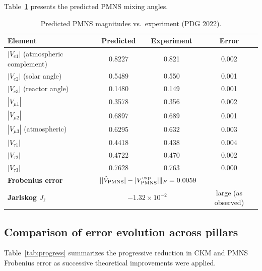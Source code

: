 \documentclass[11pt,a4paper]{article}
\theoremstyle{definition}
\theoremstyle{remark}
\begin{document}
Table~\ref{tab:pmns} presents the predicted PMNS mixing angles.

\begin{table}[H]
\centering
\caption{Predicted PMNS magnitudes vs.\ experiment (PDG 2022).}
\label{tab:pmns}
\begin{tabular}{lccc}
\toprule
\textbf{Element} & \textbf{Predicted} & \textbf{Experiment} & \textbf{Error} \\
\midrule
$|V_{e1}|$ (atmospheric complement)  & 0.8227 & 0.821  & 0.002 \\
$|V_{e2}|$ (solar angle)             & 0.5489 & 0.550  & 0.001 \\
$|V_{e3}|$ (reactor angle)           & 0.1480 & 0.149  & 0.001 \\
$|V_{\mu 1}|$                        & 0.3578 & 0.356  & 0.002 \\
$|V_{\mu 2}|$                        & 0.6897 & 0.689  & 0.001 \\
$|V_{\mu 3}|$ (atmospheric)          & 0.6295 & 0.632  & 0.003 \\
$|V_{\tau 1}|$                       & 0.4418 & 0.438  & 0.004 \\
$|V_{\tau 2}|$                       & 0.4722 & 0.470  & 0.002 \\
$|V_{\tau 3}|$                       & 0.7628 & 0.763  & 0.000 \\
\midrule
\textbf{Frobenius error} & \multicolumn{2}{c}{$\||\hat V_{\rm PMNS}| - |V_{\rm PMNS}^{\rm exp}|\|_F = 0.0059$} & \\
\textbf{Jarlskog $J_\ell$} & \multicolumn{2}{c}{$-1.32 \times 10^{-2}$} & large (as observed) \\
\bottomrule
\end{tabular}
\end{table}

\subsection{Comparison of error evolution across pillars}

Table~\ref{tab:progress} summarizes the progressive reduction in CKM and PMNS
Frobenius error as successive theoretical improvements were applied.
\end{document}
